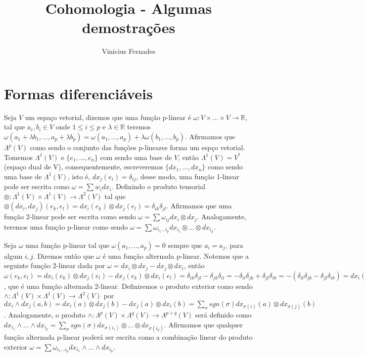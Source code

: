 \documentclass{article}
\begin{document}
	
	\title{Cohomologia - Algumas demostrações}
	\author{Vinicius Fernades}
	
	\maketitle
	
	\section{Formas diferenciáveis}
	
	Seja $V$ um espaço vetorial, dizemos que uma função p-linear é $\omega : V \times \dots \times V \to \mathbb{R}$, tal que $a_{i}, b_{i} \in V$ onde $1\leq i \leq p$ e $\lambda \in \mathbb{R}$ teremos $\omega(a_{1} + \lambda b_{1}, ..., a_{p} + \lambda b_{p}) = \omega(a_{1} , ..., a_{p} )+ \lambda \omega(b_{1}, ..., b_{p})$. Afirmamos que $\Lambda^{p}(V)$ como sendo o conjunto das funções p-lineares forma um espço vetorial. Tomemos $\Lambda^{1}(V)$ e $\{e_{1}, ..., e_{n}\}$ com sendo uma base de $V$, então $\Lambda^{1}(V) = V^{*}$ (espaço dual de V), consequentemente, escreveremos $\{dx_{1}, ..., dx_{n}\}$ como sendo uma base de $\Lambda^{1}(V)$, isto é, $dx_{j}(e_{i}) = \delta_{ij}$, desse modo, uma função 1-linear pode ser escrita como $\omega = \sum w_{i}dx_{i}$. Definindo o produto tensorial $\otimes: \Lambda^{1}(V) \times \Lambda^{1}(V) \to \Lambda^{2}(V)$ tal que $\otimes(dx_{i}, dx_{j})(e_{k}, e_{l}) = dx_{i}(e_{k}) \otimes dx_{j}(e_{l}) = \delta_{ik}\delta_{jl}$. Afirmamos que uma função 2-linear pode ser escrita como sendo $\omega = \sum \omega_{ij}dx_{i} \otimes dx_{j}$. Analogamente, teremos uma função p-linear como sendo  $\omega = \sum \omega_{i_{1}...i_{p}}dx_{i_{1}} \otimes ... \otimes dx_{i_{p}}$.
	
	Seja $\omega$ uma função p-linear tal que $\omega(a_{1}, ..., a_{p}) = 0 $ sempre que $a_{i} = a_{j}$, para algum $i, j$. Diremos então que $\omega$ é uma função alternada p-linear. Notemos que a seguinte função 2-linear dada por $\omega = dx_{i} \otimes dx_{j} - dx_{j} \otimes dx_{i}$, então $\omega(e_{k},e_{l}) = dx_{i}(e_{k}) \otimes dx_{j}(e_{l}) - dx_{j}(e_{k}) \otimes dx_{i}(e_{l}) = \delta_{ik}\delta_{jl} - \delta_{jk}\delta_{il} =  -\delta_{il}\delta_{jk} + \delta_{jl}\delta_{ik}= -(\delta_{il}\delta_{jk} - \delta_{jl}\delta_{ik}) = dx_{i}(e_{l}) \otimes dx_{j}(e_{k}) - dx_{j}(e_{l}) \otimes dx_{i}(e_{k}) = -\omega(e_{l}, e_{k})$, que é uma função alternada 2-linear. Definiremos o produto exterior como sendo $\wedge: \Lambda^{1}(V) \times \Lambda^{1}(V) \to \Lambda^{2}(V)$ por $ dx_{i} \wedge dx_{j}(a, b) = dx_{i}(a) \otimes dx_{j}(b) - dx_{j}(a) \otimes dx_{i}(b) = \sum_{\sigma} sgn(\sigma) dx_{\sigma(i)}(a) \otimes dx_{\sigma(j)}(b)$. Analogamente, o produto $\wedge: \Lambda^{p}(V) \times \Lambda^{q}(V) \to \Lambda^{p+q}(V)$ será definido como $dx_{i_{1}} \wedge ... \wedge dx_{i_{p}} = \sum_{\sigma}  sgn(\sigma) dx_{\sigma (i_{1})} \otimes ... \otimes dx_{\sigma (i_{p})}$. Afirmamos que qualquer função alternada p-linear poderá ser escrita como a combinação linear do produto exterior $\omega = \sum \omega_{i_{1}...i_{p}} dx_{i_{1}} \wedge... \wedge dx_{i_{p}}$.
	
\end{document}

